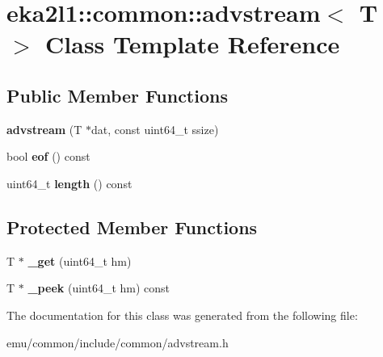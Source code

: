 \hypertarget{classeka2l1_1_1common_1_1advstream}{}\section{eka2l1\+:\+:common\+:\+:advstream$<$ T $>$ Class Template Reference}
\label{classeka2l1_1_1common_1_1advstream}
\subsection*{Public Member Functions}
\begin{DoxyCompactItemize}
\item 
\mbox{\label{classeka2l1_1_1common_1_1advstream_a1ca69394b0ddae3e315f398fb56af47a}} 
{\bfseries advstream} (T $\ast$dat, const uint64\+\_\+t ssize)
\item 
\mbox{\label{classeka2l1_1_1common_1_1advstream_a3361b7e432735131fd79d679e61c8118}} 
bool {\bfseries eof} () const
\item 
\mbox{\label{classeka2l1_1_1common_1_1advstream_a903d013c78bd7a063f0cb64227eaaf72}} 
uint64\+\_\+t {\bfseries length} () const
\end{DoxyCompactItemize}
\subsection*{Protected Member Functions}
\begin{DoxyCompactItemize}
\item 
\mbox{\label{classeka2l1_1_1common_1_1advstream_a2573169f4486a2208b7259fdd5b90d63}} 
T $\ast$ {\bfseries \+\_\+get} (uint64\+\_\+t hm)
\item 
\mbox{\label{classeka2l1_1_1common_1_1advstream_a94fe34525ad15517f83f87f1a1592312}} 
T $\ast$ {\bfseries \+\_\+peek} (uint64\+\_\+t hm) const
\end{DoxyCompactItemize}


The documentation for this class was generated from the following file\+:\begin{DoxyCompactItemize}
\item 
emu/common/include/common/advstream.\+h\end{DoxyCompactItemize}

